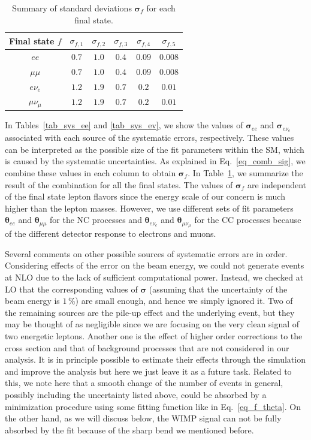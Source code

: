 \documentclass[12pt,twoside,book]{article}
\begin{document}
\begin{table}[t]
  \centering
  \begin{tabular}{c|ccccc}
    Final state $f$ & $\sigma_{f,1}$ & $\sigma_{f,2}$ & $\sigma_{f,3}$ & $\sigma_{f,4}$ & $\sigma_{f,5}$ \\ \hline
    $ee$ & $0.7$ & $1.0$ & $0.4$ & $0.09$ & $0.008$ \\
    $\mu\mu$ & $0.7$ & $1.0$ & $0.4$ & $0.09$ & $0.008$ \\
    $e\nu_e$ & $1.2$ & $1.9$ & $0.7$ & $0.2$ & $0.01$ \\
    $\mu\nu_\mu$ & $1.2$ & $1.9$ & $0.7$ & $0.2$ & $0.01$ \\
  \end{tabular}
  \caption{
    Summary of standard deviations $\bm{\sigma}_f$ for each final state.
  }
  \label{tab_sys}
\end{table}

In Tables~\ref{tab_sys_ee} and \ref{tab_sys_ev}, we show the values of $\bm{\sigma}_{ee}$ and $\bm{\sigma}_{e\nu_e}$ associated with each source of the systematic errors, respectively.
These values can be interpreted as the possible size of the fit parameters within the SM, which is caused by the systematic uncertainties.
As explained in Eq.~\eqref{eq_comb_sig}, we combine these values in each column to obtain $\bm{\sigma}_f$.
In Table~\ref{tab_sys}, we summarize the result of the combination for all the final states.
The values of $\bm{\sigma}_f$ are independent of the final state lepton flavors since the energy scale of our concern is much higher than the lepton masses.
However, we use different sets of fit parameters $\bm{\theta}_{ee}$ and $\bm{\theta}_{\mu\mu}$ for the NC processes and $\bm{\theta}_{e\nu_e}$ and $\bm{\theta}_{\mu\nu_\mu}$ for the CC processes because of the different detector response to electrons and muons.

Several comments on other possible sources of systematic errors are in order.
Considering effects of the error on the beam energy, we could not generate events at NLO due to the lack of sufficient computational power.
Instead, we checked at LO that the corresponding values of $\bm{\sigma}$ (assuming that the uncertainty of the beam energy is $1\,\%$) are small enough, and hence we simply ignored it.
Two of the remaining sources are the pile-up effect and the underlying event, but they may be thought of as negligible since we are focusing on the very clean signal of two energetic leptons.
Another one is the effect of higher order corrections to the cross section and that of background processes that are not considered in our analysis.
It is in principle possible to estimate their effects through the simulation and improve the analysis but here we just leave it as a future task.
Related to this, we note here that a smooth change of the number of events in general, possibly including the uncertainty listed above, could be absorbed by a minimization procedure using some fitting function like in Eq.~\eqref{eq_f_theta}.
On the other hand, as we will discuss below, the WIMP signal can not be fully absorbed by the fit because of the sharp bend we mentioned before.
\end{document}
